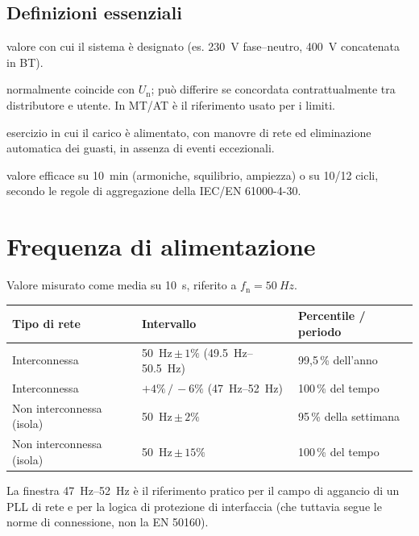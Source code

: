 \documentclass[11pt,a4paper]{article}
\newcommand{\Uc}{U_{\mathrm{c}}}
\newcommand{\Un}{U_{\mathrm{n}}}
\begin{document}
\subsection*{Definizioni essenziali}

\begin{description}[style=nextline,leftmargin=0pt,itemsep=2pt]
  \item[Tensione nominale $\Un$] valore con cui il sistema è designato
        (es. \SI{230}{V} fase--neutro, \SI{400}{V} concatenata in BT).
  \item[Tensione dichiarata $\Uc$] normalmente coincide con $\Un$; può differire se
        concordata contrattualmente tra distributore e utente. In MT/AT è il
        riferimento usato per i limiti.
  \item[Condizioni normali di esercizio] esercizio in cui il carico è alimentato,
        con manovre di rete ed eliminazione automatica dei guasti, in assenza di
        eventi eccezionali.
  \item[Valore aggregato] valore efficace su \SI{10}{\minute} (armoniche, squilibrio,
        ampiezza) o su 10/12 cicli, secondo le regole di aggregazione della
        IEC/EN 61000-4-30.
\end{description}

\section{Frequenza di alimentazione}

Valore misurato come media su \SI{10}{\second}, riferito a $f_\mathrm{n}=\SI{50}{Hz}$.

\begin{table}[h]
\centering
\begin{tabular}{lll}
\toprule
\textbf{Tipo di rete} & \textbf{Intervallo} & \textbf{Percentile / periodo} \\
\midrule
Interconnessa & \SI{50}{Hz}\,$\pm\,1\%$ (\SIrange{49.5}{50.5}{Hz}) & 99,5\,\% dell'anno \\
Interconnessa & $+4\%\,/\,-6\%$ (\SIrange{47}{52}{Hz}) & 100\,\% del tempo \\
Non interconnessa (isola) & \SI{50}{Hz}\,$\pm\,2\%$ & 95\,\% della settimana \\
Non interconnessa (isola) & \SI{50}{Hz}\,$\pm\,15\%$ & 100\,\% del tempo \\
\bottomrule
\end{tabular}
\end{table}

\noindent
La finestra \SIrange{47}{52}{Hz} è il riferimento pratico per il campo di aggancio
di un PLL di rete e per la logica di protezione di interfaccia (che tuttavia segue
le norme di connessione, non la EN 50160).
\end{document}
